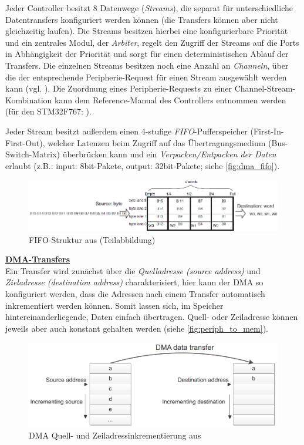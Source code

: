 \documentclass[a4paper, portrait, 12pt]{scrartcl} %
\begin{document}
Jeder Controller besitzt 8 Datenwege (\emph{Streams}), die separat für unterschiedliche Datentransfers konfiguriert werden können (die Transfers können aber nicht gleichzeitig laufen). Die Streams besitzen hierbei eine konfigurierbare Priorität und ein zentrales Modul, der \emph{Arbiter}, regelt den Zugriff der Streams auf die Ports in Abhängigkeit der Priorität und sorgt für einen deterministischen Ablauf der Transfers. Die einzelnen Streams besitzen noch eine Anzahl an \emph{Channeln}, über die der entsprechende Peripherie-Request für einen Stream ausgewählt werden kann (vgl. \cite[S. 7ff]{STmicroelectronics2016}). Die Zuordnung eines Peripherie-Requests zu einer Channel-Stream-Kombination kann dem Reference-Manual des Controllers entnommen werden (für den STM32F767: \cite[S. 252]{STmicroelectronics2024}).

\pagebreak

Jeder Stream besitzt außerdem einen 4-stufige \emph{FIFO}-Pufferspeicher (First-In-First-Out), welcher Latenzen beim Zugriff auf das Übertragungsmedium (Bus-Switch-Matrix) überbrücken kann und ein \emph{Verpacken/Entpacken der Daten} erlaubt (z.B.: input: 8bit-Pakete, output: 32bit-Pakete; siehe \autoref{fig:dma_fifo}).

\begin{figure}[H]
	\centering
    \includegraphics[scale=0.8]{STM32_DMA_FIFO.png} 
	\caption{FIFO-Struktur aus \cite[S. 11]{STmicroelectronics2016} (Teilabbildung)}
	\label{fig:dma_fifo}
\end{figure}

\textbf{\underline{DMA-Transfers}}\\
Ein Transfer wird zunächst über die \emph{Quelladresse (source address)} und \emph{Zieladresse (destination address)} charakterisiert, hier kann der DMA so konfiguriert werden, dass die Adressen nach einem Transfer automatisch inkrementiert werden können. Somit lassen sich, im Speicher hintereinanderliegende, Daten einfach übertragen. Quell- oder Zeiladresse können jeweils aber auch konstant gehalten werden (siehe \autoref{fig:periph_to_mem}).

\begin{figure}[H]
	\centering
    \includegraphics[scale=0.6]{STM32_DMA_transfer_incrementing.png} 
	\caption{DMA Quell- und Zeiladressinkrementierung aus \cite[S. 10]{STmicroelectronics2016}}
	\label{fig:dma_transfer_inc}
\end{figure}
\end{document}
